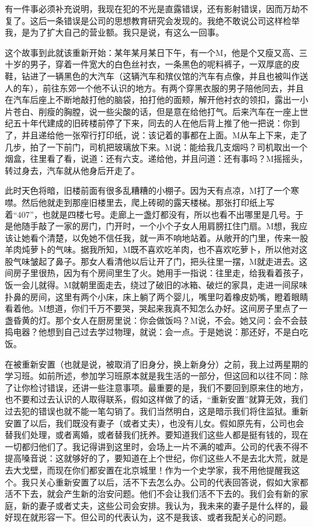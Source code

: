 有一件事必须补充说明，我现在犯的不光是直露错误，还有影射错误，因而万劫不复了。这后一条错误是公司的思想教育研究会发现的。我绝不敢说公司这样检举我，是为了扩大自己的营业额。我只是说，有这么一回事。 

这个故事到此就该重新开始：某年某月某日下午，有一个M，他是个又瘦又高、三十岁的男子，穿着一件宽大的白色丝衬衣，一条黑色的呢料裤子，一双厚底的皮鞋，钻进了一辆黑色的大汽车（这辆汽车和殡仪馆的汽车有点像，并且也被叫作送人的车），前往东郊一个他不认识的地方。有两个穿黑衣服的男子陪他同去，并且在汽车后座上不断地敲打他的脑袋，拍打他的面颊，解开他衬衣的领扣，露出一小片苍白、削瘦的胸膛，说一些尖酸的话，但是意在给他打气。后来汽车在一座上世纪五十年代建成的旧砖楼前停了下来，同去的人在他后背上推了他一把说：你到了，并且递给他一张窄行打印纸，说：该记着的事都在上面。M从车上下来，走了几步，拍了一下前门，司机把玻璃放下来。M说：能给我几支烟吗？司机取出一个烟盒，往里看了看，说道：还有六支。递给他，并且问道：还有事吗？M摇摇头，转过身去，汽车就从他身后开走了。 

此时天色将暗，旧楼前面有很多乱糟糟的小棚子。因为天有点凉，M打了一个寒噤。然后他就走到那座旧楼里去，爬上砖砌的露天楼梯。那张打印纸上写着“407”，也就是四楼七号。走廊上一盏灯都没有，所以也看不出哪里是几号。于是他随手敲了一家的房门，门开时，一个小个子女人用肩膀扛住门扇。M想，我应该让她看个清楚，以免她不信任我，就一声不响地站着。从敞开的门里，传来一股羊肉炖萝卜的气味。据我所知，M既不喜欢吃羊肉，也不喜欢吃萝卜，所以他对这股气味皱起了鼻子。那女人看清他以后让开了门，把头往里一摆，M就走进去。这间房子里很热，因为有个房间里生了火。她用手一指说：往里走，给我看着孩子，饭一会儿就得。M就朝里面走去，绕过了破旧的冰箱、破烂的家具，走进一间尿味扑鼻的房间，这里有两个小床，床上躺了两个婴儿，嘴里叼着橡皮奶嘴，瞪着眼睛看着他。M想道，你们千万不要哭，哭起来我真不知怎么办好。这间房子里点了一盏昏黄的灯。那个女人在厨房里说：你会做饭吗？M说，不会。她又问：会不会鼓捣电器？他想到自己过去学过物理，就说：会一点。于是她说：那还好，不是白吃饭。 

在被重新安置（也就是说，被取消了旧身分，换上新身分）之前，我上过两星期的学习班。如前所述，参加学习班原本就是我生活的一部分，但这回和以往不同：除了让你检讨错误，还讲一些注意事项。最重要的是，我们不要回到原来住的地方，也不要和过去认识的人取得联系，假如这样做了的话，“重新安置”就算无效，我们过去犯的错误也就不能一笔勾销了。我们当然明白，这是暗示我们将住监狱。重新安置了以后，我们既没有妻子（或者丈夫），也没有儿女。假如原先有，公司也会替我们处理，或者离婚，或者替我们抚养。要知道我们这些人都是挺有钱的，现在一切都归他们了。我记得讲到这里时，会场上一片不满的嘘声。公司的代表不得不提高嗓音说：这就够好的了，要知道在上个世纪，你们这些人不是去北大荒，就是去大戈壁，而现在你们都安置在北京城里！作为一个史学家，我不用他提醒我这个。我只关心重新安置了以后，活不下去怎么办。公司的代表回答说，假如大家都活不下去，就会产生新的治安问题。他们不会让我们活不下去的。我们会有新的家庭，新的妻子或者丈夫，这些公司会安排。我认为，我未来的妻子是什么样的，最好现在就形容一下。但公司的代表认为，这不是我该、或者我配关心的问题。 

